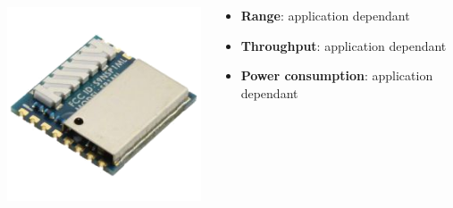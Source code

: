 \documentclass[11pt,xcolor=table,aspectratio=169]{beamer}
\begin{document}
\begin{frame}
{\begin{columns}
\begin{column}{.3\textwidth}
\begin{adjustbox}{max height=.3\textheight}
						\includegraphics[width=\textwidth]{media/subGhz.png}
					\end{adjustbox}
				\end{column}
				\begin{column}{.7\textwidth}
					\begin{itemize}
						\item \textbf{Range}: application dependant
						\item \textbf{Throughput}: application dependant
						\item \textbf{Power consumption}: application dependant
					\end{itemize}
				\end{column}
			\end{columns}
		}
	\end{frame}
\end{document}
